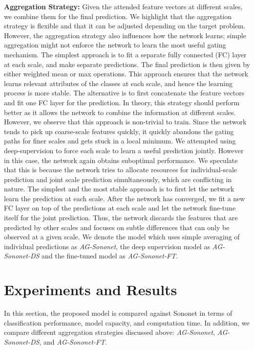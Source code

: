 \documentclass{article}
\begin{document}
\textbf{Aggregation Strategy:} Given the attended feature vectors at different scales, we combine them for the final prediction. We highlight that the aggregation strategy is flexible and that it can be adjusted depending on the target problem. However, the aggregation strategy also influences how the network learns; simple aggregation might not enforce the network to learn the most useful gating mechanism. The simplest approach is to fit a separate fully connected (FC) layer at each scale, and make separate predictions. The final prediction is then given by either weighted mean or max operations. This approach ensures that the network learns relevant attributes of the classes at each scale, and hence the learning process is more stable. The alternative is to first concatenate the feature vectors and fit one FC layer for the prediction. In theory, this strategy should perform better as it allows the network to combine the information at different scales. However, we observe that this approach is non-trivial to train. Since the network tends to pick up coarse-scale features quickly, it quickly abandons the gating paths for finer scales and gets stuck in a local minimum. We attempted using deep-supervision \cite{lee2015deeply} to force each scale to learn a useful prediction jointly. However in this case, the network again obtains suboptimal performance. We speculate that this is because the network tries to allocate resources for individual-scale prediction and joint scale prediction simultaneously, which are conflicting in nature. The simplest and the most stable approach is to first let the network learn the prediction at each scale. After the network has converged, we fit a new FC layer on top of the predictions at each scale and let the network fine-tune itself for the joint prediction. Thus, the network discards the features that are predicted by other scales and focuses on subtle differences that can only be observed at a given scale. We denote the model which uses simple averaging of individual predictions as \emph{AG-Sononet}, the deep supervision model as \emph{AG-Sononet-DS} and the fine-tuned model as \emph{AG-Sononet-FT}.

\section{Experiments and Results}

In this section, the proposed model is compared against Sononet in terms of classification performance, model capacity, and computation time. In addition, we compare different aggregation strategies discussed above: \emph{AG-Sononet}, \emph{AG-Sononet-DS}, and \emph{AG-Sononet-FT}. 
\end{document}
